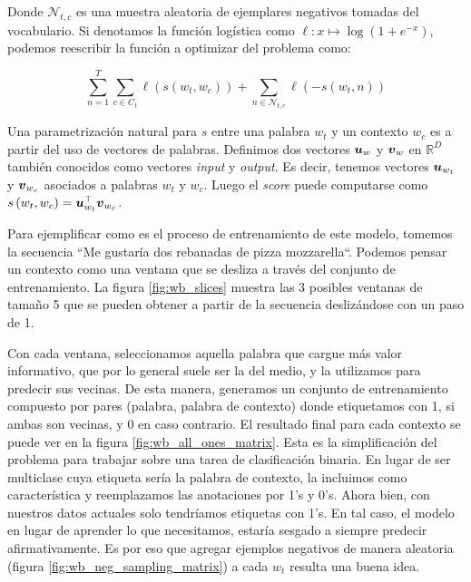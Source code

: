 Donde $\mathcal{N}_{t, c}$ es una muestra aleatoria de ejemplares negativos
tomadas del vocabulario. Si denotamos la función logística como $\ell: x \mapsto
\log \left(1 + e^{-x} \right)$, podemos reescribir la función a optimizar del
problema como:

\begin{equation}
    \sum_{n=1}^{T} 
        \sum_{c \in C_t} \ell\left(s(w_t, w_c)\right) +
        \sum_{n \in \mathcal{N}_{t, c}} \ell\left(-s(w_t, n) \right)
\end{equation}

Una parametrización natural para $s$ entre una palabra $w_t$ y un contexto $w_c$
es a partir del uso de vectores de palabras. Definimos dos vectores $\boldsymbol{u}_w$
y $\boldsymbol{v}_w$ en $\mathbb{R}^D$ también conocidos como vectores \emph{input} y
\emph{output}. Es decir, tenemos vectores $\boldsymbol{u}_{w_t}$ y $\boldsymbol{v}_{w_c}$
asociados a palabras $w_t$ y $w_c$. Luego el \emph{score} puede computarse como
$s\left( w_t, w_c \right) = \boldsymbol{u}_{w_t}^\top \boldsymbol{v}_{w_c}$.

Para ejemplificar como es el proceso de entrenamiento de este modelo, tomemos la
secuencia ``Me gustaría dos rebanadas de pizza mozzarella``. Podemos pensar un
contexto como una ventana que se desliza a través del conjunto de entrenamiento.
La figura \ref{fig:wb_slices} muestra las 3 posibles ventanas de tamaño 5 que se
pueden obtener a partir de la secuencia deslizándose con un paso de 1.

Con cada ventana, seleccionamos aquella palabra que cargue más valor
informativo, que por lo general suele ser la del medio, y la utilizamos para
predecir sus vecinas. De esta manera, generamos un conjunto de entrenamiento
compuesto por pares (palabra, palabra de contexto) donde etiquetamos con 1, si
ambas son vecinas, y 0 en caso contrario. El resultado final para cada contexto
se puede ver en la figura \ref{fig:wb_all_ones_matrix}. Esta es la
simplificación del problema para trabajar sobre una tarea de clasificación
binaria. En lugar de ser multiclase cuya  etiqueta sería la palabra de contexto,
la incluimos como característica y reemplazamos las anotaciones por 1's y 0's.
Ahora bien, con nuestros datos actuales solo tendríamos etiquetas con 1's. En
tal caso, el modelo en lugar de aprender lo que necesitamos, estaría sesgado a
siempre predecir afirmativamente. Es por eso que agregar ejemplos negativos de
manera aleatoria (figura \ref{fig:wb_neg_sampling_matrix}) a cada $w_t$ resulta
una buena idea.


